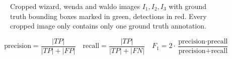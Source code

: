 \documentclass[11pt]{article}
\begin{document}
\begin{figure}
    \centering
    \begin{subfigure}{0.3\linewidth}
    \end{subfigure}
    \begin{subfigure}{0.3\linewidth}
    \end{subfigure}
    \begin{subfigure}{0.3\linewidth}
    \end{subfigure}
    \caption{Cropped wizard, wenda and waldo images \( I_1, I_2, I_3 \) with ground truth bounding boxes marked in green, detections in red.
    Every cropped image only contains only one ground truth annotation.}
    \label{fig:detections}
\end{figure}

\begin{equation*}
    \text{precision} = \frac{|TP|}{|TP| + |FP|}  
    \quad
    \text{recall} = \frac{|TP|}{|TP| + |FN|}
    \quad
    F_1 = 2\cdot \frac{\text{precision} \cdot \text{precall}}{\text{precision} + \text{recall}}
\end{equation*}
\end{document}
